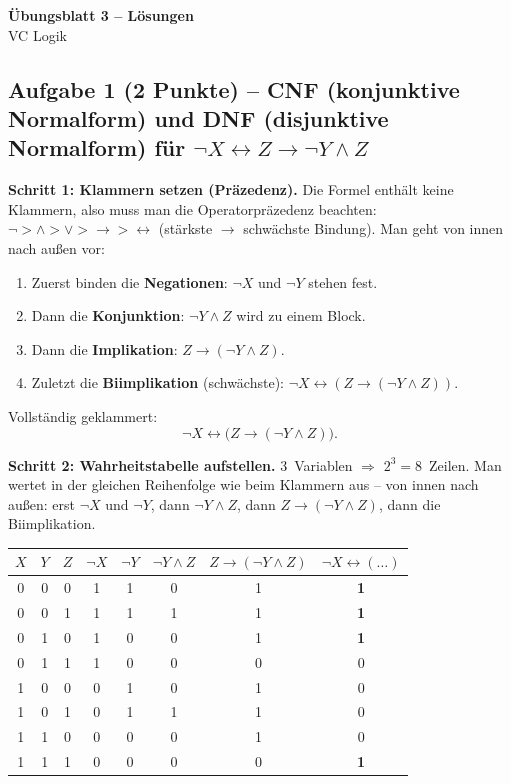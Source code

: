 \documentclass[a4paper,12pt]{article}
\begin{document}
\begin{center}
{\LARGE\bfseries \"Ubungsblatt 3 -- L\"osungen}\\[0.5em]
{\large VC Logik}
\end{center}

\bigskip

\subsection*{Aufgabe 1 \textnormal{(2 Punkte)} --
CNF (konjunktive Normalform) und DNF (disjunktive Normalform) f\"ur
$\neg X \leftrightarrow Z \to \neg Y \wedge Z$}

\textbf{Schritt 1: Klammern setzen (Pr\"azedenz).}
Die Formel enth\"alt keine Klammern, also muss man die
Operatorpr\"azedenz beachten:
$\neg > \wedge > \vee > \to > \leftrightarrow$ (st\"arkste
$\to$ schw\"achste Bindung). Man geht von innen nach au\ss en vor:

\begin{enumerate}[nosep]
\item Zuerst binden die \textbf{Negationen}: $\neg X$ und $\neg Y$
      stehen fest.
\item Dann die \textbf{Konjunktion}: $\neg Y \wedge Z$ wird zu
      einem Block.
\item Dann die \textbf{Implikation}: $Z \to (\neg Y \wedge Z)$.
\item Zuletzt die \textbf{Biimplikation} (schw\"achste):
      $\neg X \leftrightarrow (Z \to (\neg Y \wedge Z))$.
\end{enumerate}

Vollst\"andig geklammert:
\[
\neg X \leftrightarrow \bigl(Z \to (\neg Y \wedge Z)\bigr).
\]

\textbf{Schritt 2: Wahrheitstabelle aufstellen.}
3~Variablen $\Rightarrow$ $2^3 = 8$~Zeilen. Man wertet in der
gleichen Reihenfolge wie beim Klammern aus -- von innen nach au\ss en:
erst $\neg X$ und $\neg Y$, dann $\neg Y \wedge Z$, dann
$Z \to (\neg Y \wedge Z)$, dann die Biimplikation.

\begin{center}
\renewcommand{\arraystretch}{1.15}
\begin{tabular}{ccc|cc|c|c|c}
\toprule
$X$ & $Y$ & $Z$ & $\neg X$ & $\neg Y$ & $\neg Y \wedge Z$
      & $Z \to (\neg Y \wedge Z)$
      & $\neg X \leftrightarrow (\ldots)$ \\
\midrule
0 & 0 & 0 & 1 & 1 & 0 & 1 & \textbf{1} \\
0 & 0 & 1 & 1 & 1 & 1 & 1 & \textbf{1} \\
0 & 1 & 0 & 1 & 0 & 0 & 1 & \textbf{1} \\
0 & 1 & 1 & 1 & 0 & 0 & 0 & 0 \\
1 & 0 & 0 & 0 & 1 & 0 & 1 & 0 \\
1 & 0 & 1 & 0 & 1 & 1 & 1 & 0 \\
1 & 1 & 0 & 0 & 0 & 0 & 1 & 0 \\
1 & 1 & 1 & 0 & 0 & 0 & 0 & \textbf{1} \\
\bottomrule
\end{tabular}
\end{center}
\end{document}
